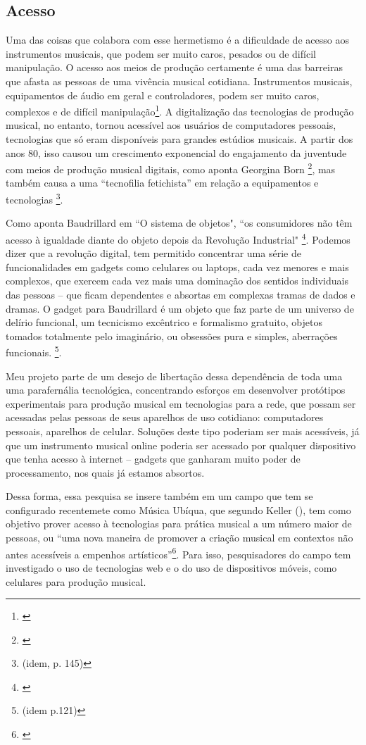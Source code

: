 \subsection{Acesso}
Uma das coisas que colabora com esse hermetismo é a dificuldade de acesso aos instrumentos musicais, que podem ser muito caros, pesados ou de difícil manipulação. O acesso aos meios de produção certamente é uma das barreiras que afasta as pessoas de uma vivência musical cotidiana. Instrumentos musicais, equipamentos de áudio em geral e controladores, podem ser muito caros, complexos e de difícil manipulação\footnote{\cite{Fiebrink2007}}. A digitalização das tecnologias de produção musical, no entanto, tornou acessível aos usuários de computadores pessoais, tecnologias que só eram disponíveis para grandes estúdios musicais. A partir dos anos 80, isso causou um crescimento exponencial do engajamento da juventude com meios de produção musical digitais, como aponta Georgina Born \footnote{\cite[143]{Born2015}}, mas também causa a uma ``tecnofilia fetichista'' em relação a equipamentos e tecnologias \footnote{(idem, p. 145)}.

Como aponta Baudrillard em ``O sistema de objetos", ``os consumidores não têm acesso à igualdade diante do objeto depois da Revolução Industrial" \footnote{\cite[162]{Baudrillard2012}}. Podemos dizer que a revolução digital, tem permitido concentrar uma série de funcionalidades em gadgets como celulares ou laptops, cada vez menores e mais complexos, que exercem cada vez mais uma dominação dos sentidos individuais das pessoas – que ficam dependentes e absortas em complexas tramas de dados e dramas. O gadget para Baudrillard é um objeto que faz parte de um universo de delírio funcional, um tecnicismo excêntrico e formalismo gratuito, objetos tomados totalmente pelo imaginário, ou obsessões pura e simples, aberrações funcionais. \footnote{(idem p.121)}. 

Meu projeto parte de um desejo de libertação dessa dependência de toda uma uma parafernália tecnológica, concentrando esforços em desenvolver protótipos experimentais para produção musical em tecnologias para a rede, que possam ser acessadas pelas pessoas de seus aparelhos de uso cotidiano: computadores pessoais, aparelhos de celular. Soluções deste tipo poderiam ser mais acessíveis, já que um instrumento musical online poderia ser acessado por qualquer dispositivo que tenha acesso à internet -- gadgets que ganharam muito poder de processamento, nos quais já estamos absortos. 

Dessa forma, essa pesquisa se insere também em um campo que tem se configurado recentemete como Música Ubíqua, que segundo Keller (\citeyear{Keller2018}), tem como objetivo prover acesso à tecnologias para prática musical a um número maior de pessoas, ou ``uma nova maneira de promover a criação musical em contextos não antes acessíveis a empenhos artísticos''\footnote{\cite{Keller2018}}. Para isso, pesquisadores do campo tem investigado o uso de tecnologias web e o do uso de dispositivos móveis, como celulares para produção musical. 

